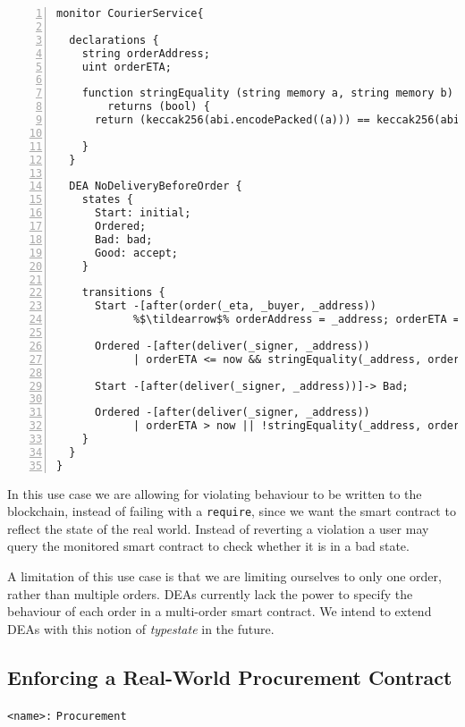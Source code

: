 \documentclass{article}
\newcommand{\tildearrow}{{\raise.37ex\hbox{$\scriptstyle\mathtt{\sim}$}}\hspace{-0.08cm}>\xspace}
\begin{document}
  
  \small\begin{lstlisting}[language=DEA,basicstyle=\scriptsize,numbers=left,numbersep=2pt,xleftmargin=0.3cm,escapechar=\%,label={dea:courierservice},caption={Monitor that only ordered items are delivered.}]
monitor CourierService{

  declarations {
    string orderAddress;
    uint orderETA;
    
    function stringEquality (string memory a, string memory b) public view 
        returns (bool) {
      return (keccak256(abi.encodePacked((a))) == keccak256(abi.encodePacked((b))) );
    
    }
  }
  
  DEA NoDeliveryBeforeOrder {
    states {
      Start: initial;
      Ordered;
      Bad: bad;
      Good: accept;
    }

    transitions {
      Start -[after(order(_eta, _buyer, _address)) 
            %$\tildearrow$% orderAddress = _address; orderETA = _eta;]-> Ordered;
            
      Ordered -[after(deliver(_signer, _address)) 
            | orderETA <= now && stringEquality(_address, orderAddress)]-> Good;
      
      Start -[after(deliver(_signer, _address))]-> Bad;
      
      Ordered -[after(deliver(_signer, _address)) 
            | orderETA > now || !stringEquality(_address, orderAddress)]-> Bad;
    }
  }
}
  \end{lstlisting}\normalsize
  
  
  In this use case we are allowing for violating behaviour to be written to the blockchain, instead of failing with a \texttt{require}, since we want the smart contract to reflect the state of the real world. Instead of reverting a violation a user may query the monitored smart contract to check whether it is in a bad state. 
  
  A limitation of this use case is that we are limiting ourselves to only one order, rather than multiple orders. DEAs currently lack the power to specify the behaviour of each order in a multi-order smart contract. We intend to extend DEAs with this notion of \emph{typestate} in the future.
  
  
   \subsection{Enforcing a Real-World Procurement Contract}
   
       \texttt{<name>:} \verb+Procurement+\\
   
\end{document}
